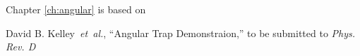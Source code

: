 \documentclass[12pt,notitlepage]{report}
\newcommand{\prd}{{\it Phys. Rev. D}}
\begin{document}
\vspace*{0.25cm}

\noindent Chapter \ref{ch:angular} is based on 

\vspace*{0.25cm}

\noindent David B. Kelley~{\it et~al.}, ``Angular Trap Demonstraion,'' to be submitted to
\prd



%
%
%
%

\afterpreface

\label{ch:introduction}

\label{ch:photothermal}

\label{ch:angular}

\label{ch:conclusion}


\clearpage



\end{document}
